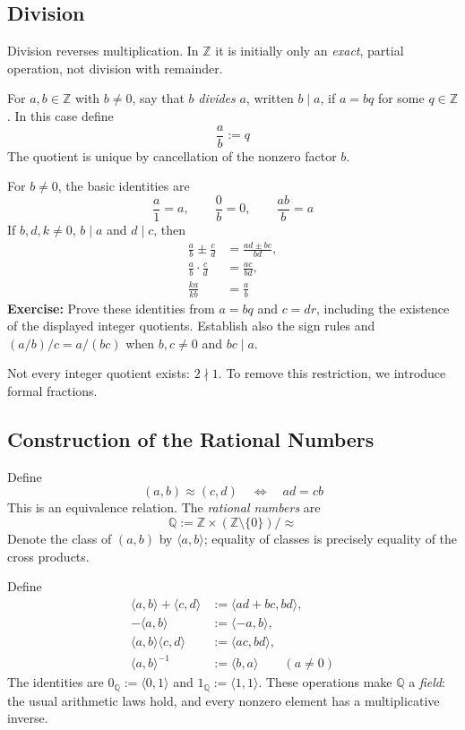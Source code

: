 \documentclass[a4paper,11pt,abstracton]{scrartcl}
\newcommand{\ZZ}{\mathbb{Z}}
\newcommand{\QQ}{\mathbb{Q}}
\theoremstyle{dotlessP}
\theoremstyle{dotlessS}
\theoremstyle{remark}
\theoremstyle{definition}
\begin{document}
\subsection{Division}
\label{subsec:division}

Division reverses multiplication. In $\ZZ$ it is initially only an
\emph{exact}, partial operation, not division with remainder.

\begin{definition_box}
For $a,b\in\ZZ$ with $b\ne0$, say that $b$ \emph{divides} $a$, written
$b\mid a$, if $a=bq$ for some $q\in\ZZ$. In this case define
\[
    \frac{a}{b}:=q
\]
The quotient is unique by cancellation of the nonzero factor $b$.
\end{definition_box}

For $b\ne0$, the basic identities are
\[
    \frac{a}{1}=a,\qquad \frac{0}{b}=0,\qquad \frac{ab}{b}=a
\]
If $b,d,k\ne0$, $b\mid a$ and $d\mid c$, then
\[
\begin{aligned}
    \frac{a}{b}\pm\frac{c}{d}&=\frac{ad\pm bc}{bd},\\
    \frac{a}{b}\cdot\frac{c}{d}&=\frac{ac}{bd},\\
    \frac{ka}{kb}&=\frac{a}{b}
\end{aligned}
\]
\textbf{Exercise:} Prove these identities from $a=bq$ and $c=dr$,
including the existence of the displayed integer quotients. Establish
also the sign rules and $(a/b)/c=a/(bc)$ when $b,c\ne0$ and $bc\mid a$.

Not every integer quotient exists: $2\nmid1$. To remove this restriction,
we introduce formal fractions.

\subsection{Construction of the Rational Numbers}
\label{subsec:rationals}

\begin{definition_box}
Define
\[
    (a,b)\approx(c,d)\quad\Longleftrightarrow\quad ad=cb
\]
This is an equivalence relation. The \emph{rational numbers} are
\[
    \QQ:=\ZZ\times(\ZZ\setminus\{0\})/\approx
\]
Denote the class of $(a,b)$ by $\langle a,b\rangle$; equality of classes
is precisely equality of the cross products.
\end{definition_box}

Define
\[
\begin{aligned}
    \langle a,b\rangle+\langle c,d\rangle&:=\langle ad+bc,bd\rangle,\\
    -\langle a,b\rangle&:=\langle-a,b\rangle,\\
    \langle a,b\rangle\langle c,d\rangle&:=\langle ac,bd\rangle,\\
    \langle a,b\rangle^{-1}&:=\langle b,a\rangle\qquad(a\ne0)
\end{aligned}
\]
The identities are $0_{\QQ}:=\langle0,1\rangle$ and
$1_{\QQ}:=\langle1,1\rangle$. These operations make $\QQ$ a
\emph{field}: the usual arithmetic laws hold, and every nonzero element
has a multiplicative inverse.
\end{document}
